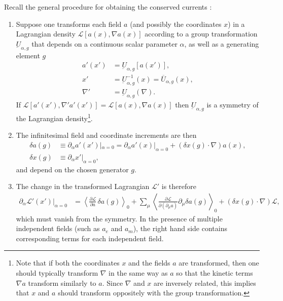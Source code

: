\documentclass[1p,sort&compress]{elsarticle}
\numberwithin{equation}{section}
\newcommand{\smean}[1]{\left\langle #1 \right\rangle}
\begin{document}
Recall the general procedure for obtaining the conserved currents \cite{Soper1976,Doran2007}:
\begin{enumerate}
  \item Suppose one transforms each field $a$ (and possibly the coordinates $x$) in a Lagrangian density $\mathcal{L}[a(x),\nabla a(x)]$ according to a group transformation $\underbar{U}_{\alpha,g}$ that depends on a continuous scalar parameter $\alpha$, as well as a generating element $g$
    \begin{subequations}\label{eq:transformations}
    \begin{align}
      a'(x') &= \underbar{U}_{\alpha,g}[a(x')], \\
      x' &= \underbar{U}^{-1}_{\alpha,g}(x) = \overline{U}_{\alpha,g}(x), \\
      \nabla' &= \underbar{U}_{\alpha,g}(\nabla).
    \end{align}
    \end{subequations}
    If $\mathcal{L}[a'(x'), \nabla' a'(x')] = \mathcal{L}[a(x),\nabla a(x)]$ then $\underbar{U}_{\alpha,g}$ is a symmetry of the Lagrangian density\footnote{Note that if both the coordinates $x$ and the fields $a$ are transformed, then one should typically transform $\nabla$ in the same way as $a$ so that the kinetic terms $\nabla a$ transform similarly to $a$.  Since $\nabla$ and $x$ are inversely related, this implies that $x$ and $a$ should transform oppositely with the group transformation.}.

  \item The infinitesimal field and coordinate increments are then
    \begin{subequations}\label{eq:increments}
    \begin{align}
      \delta a(g) &\equiv \partial_\alpha a'(x')|_{\alpha=0} = \partial_\alpha a'(x)|_{\alpha=0} + (\delta x(g) \cdot \nabla)a(x),\\
      \delta x(g) &\equiv \partial_\alpha x'|_{\alpha=0},
    \end{align}
    \end{subequations}
    and depend on the chosen generator $g$.

  \item The change in the transformed Lagrangian $\mathcal{L}'$ is therefore
    \begin{align}\label{eq:noethertransform}
      \partial_\alpha\mathcal{L}'(x')|_{\alpha = 0} &= \smean{\frac{\partial\mathcal{L}}{\partial a}\,\delta a(g)}_0 + \sum_\mu\smean{\frac{\partial\mathcal{L}}{\partial(\partial_\mu a)}\partial_\mu\delta a(g)}_0 + (\delta x(g) \cdot \nabla)\mathcal{L},
    \end{align}
    which must vanish from the symmetry.  In the presence of multiple independent fields (such as $a_e$ and $a_m$), the right hand side contains corresponding terms for each independent field.


\end{enumerate}
\end{document}
